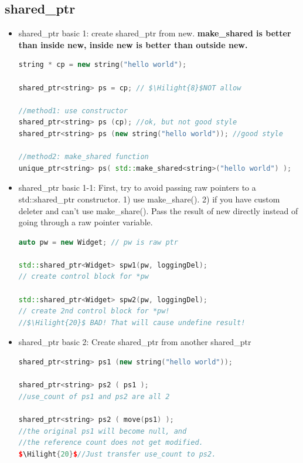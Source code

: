 \documentclass[a4paper,11pt,twoside]{book}
\newcommand{\Hilight}[1]{\makebox[0pt][l]{\color{yellow}\rule[-3pt]{#1em}{11pt}}}
\newcommand{\Hilight}[1]{}
\begin{document}
\subsection{shared\_ptr}
\begin{itemize}
\item shared\_ptr basic 1: create shared\_ptr from new. \textbf{make\_shared is better than inside new, inside new is better than outside new.}
\begin{lstlisting}[frame=single, language=c++]
string * cp = new string("hello world");

shared_ptr<string> ps = cp; // $\Hilight{8}$NOT allow

//method1: use constructor
shared_ptr<string> ps (cp); //ok, but not good style
shared_ptr<string> ps (new string("hello world")); //good style

//method2: make_shared function
unique_ptr<string> ps( std::make_shared<string>("hello world") );
\end{lstlisting}

\item shared\_ptr basic 1-1: First, try to avoid passing raw pointers to a std::shared\_ptr constructor. 1) use make\_share(). 2) if you have custom deleter and can't use make\_share().  Pass the result of new directly instead of going through a raw pointer variable.

\begin{lstlisting}[frame=single, language=c++]
auto pw = new Widget; // pw is raw ptr

std::shared_ptr<Widget> spw1(pw, loggingDel);
// create control block for *pw

std::shared_ptr<Widget> spw2(pw, loggingDel);
// create 2nd control block for *pw!
//$\Hilight{20}$ BAD! That will cause undefine result!
\end{lstlisting}

\item shared\_ptr basic 2: Create shared\_ptr from another shared\_ptr
\begin{lstlisting}[frame=single, language=c++, mathescape=true]
shared_ptr<string> ps1 (new string("hello world"));

shared_ptr<string> ps2 ( ps1 );
//use_count of ps1 and ps2 are all 2

shared_ptr<string> ps2 ( move(ps1) );
//the original ps1 will become null, and
//the reference count does not get modified.
$\Hilight{20}$//Just transfer use_count to ps2. 
\end{lstlisting}


\end{itemize}
\end{document}
